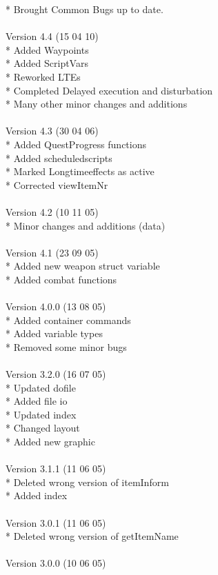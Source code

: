 \documentclass[a4paper,10pt,makeidx]{scrreprt}
\begin{document}
* Brought Common Bugs up to date.\\
\\
Version 4.4 (15 04 10)\\
* Added Waypoints\\
* Added ScriptVars\\
* Reworked LTEs\\
* Completed Delayed execution and disturbation\\
* Many other minor changes and additions\\
\\
Version 4.3 (30 04 06)\\
* Added QuestProgress functions\\
* Added scheduledscripts\\
* Marked Longtimeeffects as active\\
* Corrected viewItemNr\\
\\
Version 4.2 (10 11 05)\\
* Minor changes and additions (data)\\
\\
Version 4.1 (23 09 05)\\
* Added new weapon struct variable\\
* Added combat functions\\
\\
Version 4.0.0 (13 08 05)\\
* Added container commands\\
* Added variable types\\
* Removed some minor bugs\\
\\
Version 3.2.0 (16 07 05)\\
* Updated dofile\\
* Added file io\\
* Updated index\\
* Changed layout\\
* Added new graphic\\
\\
Version 3.1.1 (11 06 05)\\
* Deleted wrong version of itemInform\\
* Added index\\
\\
Version 3.0.1 (11 06 05)\\
* Deleted wrong version of getItemName\\
\\
Version 3.0.0 (10 06 05)\\
\end{document}
